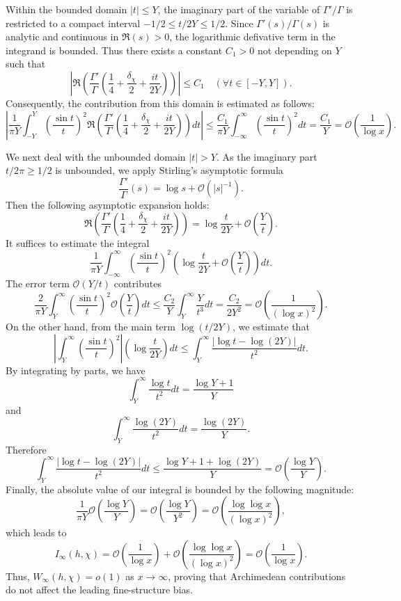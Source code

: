 \documentclass[12pt,reqno]{amsart}
\theoremstyle{definition}
\theoremstyle{remark}
\numberwithin{equation}{section}
\begin{document}
Within the bounded domain $|t| \le Y$, the imaginary part of the variable of $\Gamma'/\Gamma$ is
restricted to a compact interval $-1/2\le t/2Y \le 1/2$.
Since $\Gamma'(s)/\Gamma(s)$ is analytic and continuous in $\Re(s)>0$,
the logarithmic defivative term in the integrand is bounded.
Thus there exists a constant $C_1>0$ not depending on $Y$ such that
\[
\left|\Re\left(\frac{\Gamma'}{\Gamma}\left( \frac{1}{4} + \frac{\delta_\chi}{2} + \frac{i t}{2Y} \right)\right)
\right|
\le C_1\quad(\forall t\in[-Y,Y]).
\]
Consequently, the contribution from this domain is estimated as follows:
\[
\left|
\frac{1}{\pi Y} \int_{-Y}^{Y} \left( \frac{\sin t}{t} \right)^2 \mathfrak{R}\left( \frac{\Gamma'}{\Gamma}\left( \frac{1}{4} + \frac{\delta_\chi}{2} + \frac{i t}{2Y} \right) \right) dt
\right|
\le\frac{C_1}{\pi Y}\int_{-\infty}^\infty \left( \frac{\sin t}{t} \right)^2dt
=\frac{C_1}{Y}
=\mathcal O\left(\frac1{\log x}\right).
\]

We next deal with the unbounded domain $|t| > Y$.
As the imaginary part $t/2\pi\ge1/2$ is unbounded, we apply Stirling's asymptotic formula
\[
\frac{\Gamma'}{\Gamma}(s) = \log s + \mathcal{O}(|s|^{-1}).
\]
Then the following asymptotic expansion holds:
\[
\Re\left(\frac{\Gamma'}{\Gamma}\left( \frac{1}{4} + \frac{\delta_\chi}{2} + \frac{i t}{2Y} \right)\right)
=\log\frac t{2Y}+\mathcal O\left( \frac Yt\right).
\]
It suffices to estimate the integral
\[
\frac{1}{\pi Y} \int_{-\infty}^{\infty} \left( \frac{\sin t}{t} \right)^2 
\left(\log\frac t{2Y}+\mathcal O\left( \frac Yt\right)\right)dt.
\]
The error term $\mathcal O(Y/t)$ contributes
\[
\frac{2}{\pi Y} \int_{Y}^{\infty} \left( \frac{\sin t}{t} \right)^2 \mathcal O\left( \frac Yt\right)dt
\le\frac{C_2}Y\int_{Y}^{\infty} \frac Y{t^3}dt
=\frac{C_2}{2Y^2}
=\mathcal O\left(\frac1{(\log x)^2}\right).
\]
On the other hand, from the main term $\log(t/2Y)$, we estimate that
\[
\left|\int_{Y}^{\infty} \left( \frac{\sin t}{t} \right)^2 \right|
\left(\log\frac t{2Y}\right)dt
\le\int_{Y}^{\infty} \frac{|\log t-\log(2Y)|}{t^2} dt.
\]
By integrating by parts, we have
\[
\int_{Y}^{\infty} \frac{\log t}{t^2} dt=\frac{\log Y+1}Y
\]
and
\[
\int_{Y}^{\infty} \frac{\log (2Y)}{t^2} dt=\frac{\log(2Y)}Y.
\]
Therefore
\[
\int_{Y}^{\infty} \frac{|\log t-\log(2Y)|}{t^2} dt
\le \frac{\log Y+1+\log(2Y)}Y
=\mathcal O\left(\frac{\log Y}Y\right).
\]
Finally, the absolute value of our integral is bounded by the following magnitude:
\[
\frac1{\pi Y}\mathcal O\left(\frac{\log Y}Y\right)
=\mathcal O\left(\frac{\log Y}{Y^2}\right)
=\mathcal O\left(\frac{\log\log x}{(\log x)^2}\right),
\]
which leads to
\[
I_\infty(h, \chi) = \mathcal{O}\left(\frac{1}{\log x}\right) + \mathcal{O}\left(\frac{\log \log x}{(\log x)^2}\right) = \mathcal{O}\left(\frac{1}{\log x}\right).
\]
Thus, $W_\infty(h, \chi) = o(1)$ as $x \to \infty$, proving that Archimedean contributions do not affect the leading fine-structure bias.
\end{document}
